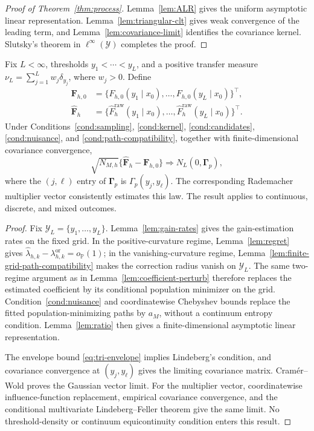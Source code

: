\begin{proof}[Proof of Theorem~\ref{thm:process}]
Lemma~\ref{lem:ALR} gives the uniform asymptotic linear representation. Lemma~\ref{lem:triangular-clt} gives weak convergence of the leading term, and Lemma~\ref{lem:covariance-limit} identifies the covariance kernel. Slutsky's theorem in \(\ell^\infty(\mathcal Y)\) completes the proof.
\end{proof}

\begin{corollary}
\label{cor:finite-grid}
Fix \(L<\infty\), thresholds \(y_1<\cdots<y_L\), and a positive transfer measure \(\nu_L=\sum_{j=1}^Lw_j\delta_{y_j}\), where \(w_j>0\). Define
\[
\begin{aligned}
\bm F_{h,0}
&=
\{F_{h,0}(y_1\mid x_0),\ldots,F_{h,0}(y_L\mid x_0)\}^{\top},\\
\widehat{\bm F}_h
&=
\{\widehat F_h^{\mathrm{raw}}(y_1\mid x_0),\ldots,
\widehat F_h^{\mathrm{raw}}(y_L\mid x_0)\}^{\top}.
\end{aligned}
\]
Under Conditions~\ref{cond:sampling}, \ref{cond:kernel},
\ref{cond:candidates}, \ref{cond:nuisance}, and
\ref{cond:path-compatibility}, together with finite-dimensional covariance
convergence,
\[
\sqrt{N_{M,h}}
\{\widehat{\bm F}_h-\bm F_{h,0}\}
\Rightarrow
N_L(0,\bm\Gamma_p),
\]
where the \((j,\ell)\) entry of \(\bm\Gamma_p\) is \(\Gamma_p(y_j,y_\ell)\). The corresponding Rademacher multiplier vector consistently estimates this law. The result applies to continuous, discrete, and mixed outcomes.
\end{corollary}

\begin{proof}
Fix \(\mathcal Y_L=\{y_1,\ldots,y_L\}\). Lemma~\ref{lem:gain-rates} gives the gain-estimation rates on the fixed grid. In the positive-curvature regime, Lemma~\ref{lem:regret} gives \(\widehat\lambda_{h,k}-\lambda_{h,k}^{\mathrm{or}}=o_{\mathbb P}(1)\); in the vanishing-curvature regime, Lemma~\ref{lem:finite-grid-path-compatibility} makes the correction radius vanish on \(\mathcal Y_L\). The same two-regime argument as in Lemma~\ref{lem:coefficient-perturb} therefore replaces the estimated coefficient by its conditional population minimizer on the grid. Condition~\ref{cond:nuisance} and coordinatewise Chebyshev bounds replace the fitted population-minimizing paths by \(a_M\), without a continuum entropy condition. Lemma~\ref{lem:ratio} then gives a finite-dimensional asymptotic linear representation.

The envelope bound \eqref{eq:tri-envelope} implies Lindeberg's condition, and covariance convergence at \((y_j,y_\ell)\) gives the limiting covariance matrix. Cram\'er--Wold proves the Gaussian vector limit. For the multiplier vector, coordinatewise influence-function replacement, empirical covariance convergence, and the conditional multivariate Lindeberg--Feller theorem give the same limit. No threshold-density or continuum equicontinuity condition enters this result.
\end{proof}
